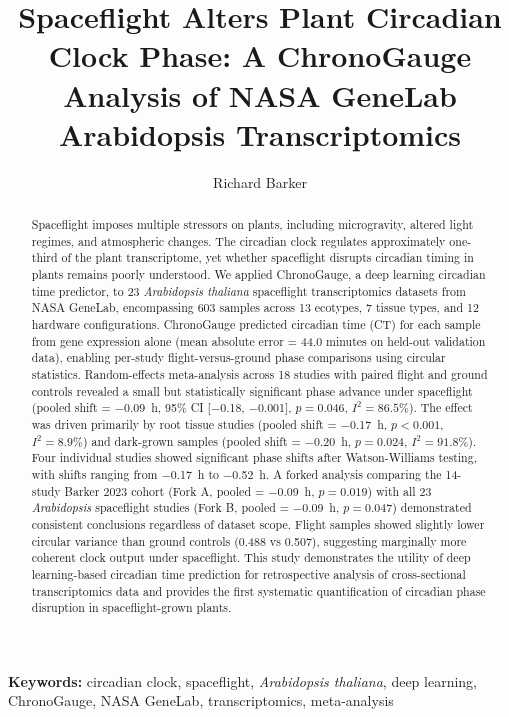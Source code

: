 \documentclass[11pt,a4paper]{article}
\title{Spaceflight Alters Plant Circadian Clock Phase: A ChronoGauge Analysis of NASA GeneLab Arabidopsis Transcriptomics}
\author[1]{Richard Barker}
\affil[1]{Affiliation to be added}
\date{}
\begin{document}
\maketitle

\begin{abstract}
Spaceflight imposes multiple stressors on plants, including microgravity, altered light regimes, and atmospheric changes. The circadian clock regulates approximately one-third of the plant transcriptome, yet whether spaceflight disrupts circadian timing in plants remains poorly understood. We applied ChronoGauge, a deep learning circadian time predictor, to 23 \textit{Arabidopsis thaliana} spaceflight transcriptomics datasets from NASA GeneLab, encompassing 603 samples across 13 ecotypes, 7 tissue types, and 12 hardware configurations. ChronoGauge predicted circadian time (CT) for each sample from gene expression alone (mean absolute error = 44.0 minutes on held-out validation data), enabling per-study flight-versus-ground phase comparisons using circular statistics. Random-effects meta-analysis across 18 studies with paired flight and ground controls revealed a small but statistically significant phase advance under spaceflight (pooled shift = $-$0.09~h, 95\% CI [$-$0.18, $-$0.001], $p = 0.046$, $I^2 = 86.5\%$). The effect was driven primarily by root tissue studies (pooled shift = $-$0.17~h, $p < 0.001$, $I^2 = 8.9\%$) and dark-grown samples (pooled shift = $-$0.20~h, $p = 0.024$, $I^2 = 91.8\%$). Four individual studies showed significant phase shifts after Watson-Williams testing, with shifts ranging from $-$0.17~h to $-$0.52~h. A forked analysis comparing the 14-study Barker 2023 cohort (Fork A, pooled = $-$0.09~h, $p = 0.019$) with all 23 \textit{Arabidopsis} spaceflight studies (Fork B, pooled = $-$0.09~h, $p = 0.047$) demonstrated consistent conclusions regardless of dataset scope. Flight samples showed slightly lower circular variance than ground controls (0.488 vs 0.507), suggesting marginally more coherent clock output under spaceflight. This study demonstrates the utility of deep learning-based circadian time prediction for retrospective analysis of cross-sectional transcriptomics data and provides the first systematic quantification of circadian phase disruption in spaceflight-grown plants.
\end{abstract}

\noindent\textbf{Keywords:} circadian clock, spaceflight, \textit{Arabidopsis thaliana}, deep learning, ChronoGauge, NASA GeneLab, transcriptomics, meta-analysis
\end{document}
